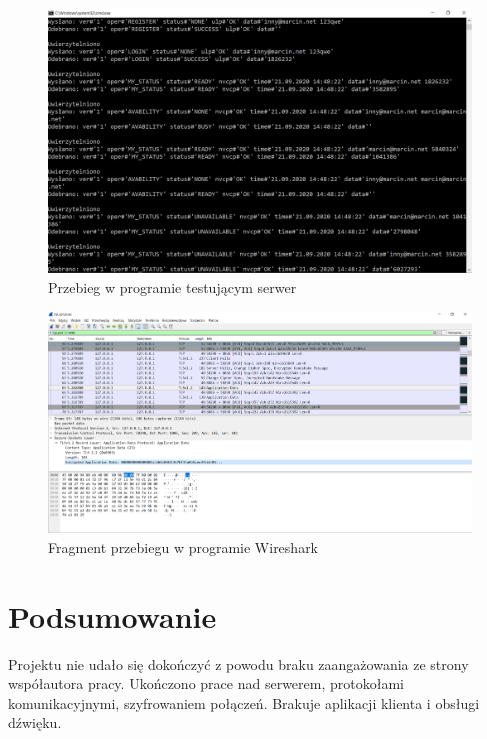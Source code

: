 \documentclass[12pt,a4paper]{article}
\begin{document}
	\begin{figure}[h!]
		\begin{center}
			\includegraphics*[width=.75\textwidth]{testy_2.png}
		\end{center}
		\caption{Przebieg w programie testującym serwer}
	\end{figure}
	
	\pagebreak
	
	\begin{figure}[h!]
		\begin{center}
			\includegraphics*[width=.95\textwidth]{wire_1.png}
		\end{center}
		\caption{Fragment przebiegu w programie Wireshark}
	\end{figure}

	
	
	\pagebreak
	\section{Podsumowanie}
	\par Projektu nie udało się dokończyć z powodu braku zaangażowania ze strony współautora pracy. Ukończono prace nad serwerem, protokołami komunikacyjnymi, szyfrowaniem połączeń. Brakuje aplikacji klienta i obsługi dźwięku.
			
\end{document}
